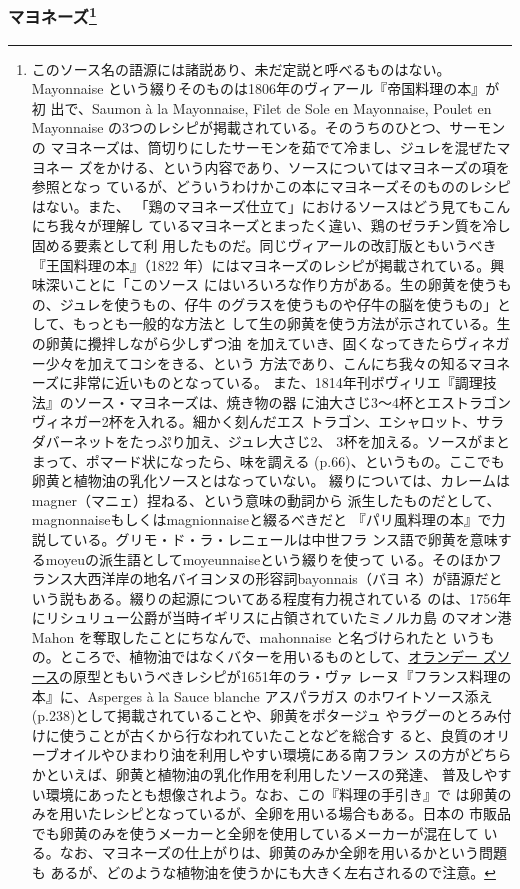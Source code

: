 \begin{recette}
{\subsubsection[マヨネーズ]{\texorpdfstring{マヨネーズ\footnote{このソース名の語源には諸説あり、未だ定説と呼べるものはない。
  Mayonnaise という綴りそのものは1806年のヴィアール『帝国料理の本』が初
  出で、Saumon à la Mayonnaise, Filet de Sole en Mayonnaise, Poulet en
  Mayonnaise の3つのレシピが掲載されている。そのうちのひとつ、サーモンの
  マヨネーズは、筒切りにしたサーモンを茹でて冷まし、ジュレを混ぜたマヨネー
  ズをかける、という内容であり、ソースについてはマヨネーズの項を参照となっ
  ているが、どういうわけかこの本にマヨネーズそのもののレシピはない。また、
  「鶏のマヨネーズ仕立て」におけるソースはどう見てもこんにち我々が理解し
  ているマヨネーズとまったく違い、鶏のゼラチン質を冷し固める要素として利
  用したものだ。同じヴィアールの改訂版ともいうべき『王国料理の本』（1822
  年）にはマヨネーズのレシピが掲載されている。興味深いことに「このソース
  にはいろいろな作り方がある。生の卵黄を使うもの、ジュレを使うもの、仔牛
  のグラスを使うものや仔牛の脳を使うもの」として、もっとも一般的な方法と
  して生の卵黄を使う方法が示されている。生の卵黄に攪拌しながら少しずつ油
  を加えていき、固くなってきたらヴィネガー少々を加えてコシをきる、という
  方法であり、こんにち我々の知るマヨネーズに非常に近いものとなっている。
  また、1814年刊ボヴィリエ『調理技法』のソース・マヨネーズは、焼き物の器
  に油大さじ3〜4杯とエストラゴンヴィネガー2杯を入れる。細かく刻んだエス
  トラゴン、エシャロット、サラダバーネットをたっぷり加え、ジュレ大さじ2、
  3杯を加える。ソースがまとまって、ポマード状になったら、味を調える
  (p.66)、というもの。ここでも卵黄と植物油の乳化ソースとはなっていない。
  綴りについては、カレームはmagner（マニェ）捏ねる、という意味の動詞から
  派生したものだとして、magnonnaiseもしくはmagnionnaiseと綴るべきだと
  『パリ風料理の本』で力説している。グリモ・ド・ラ・レニェールは中世フラ
  ンス語で卵黄を意味するmoyeuの派生語としてmoyeunnaiseという綴りを使って
  いる。そのほかフランス大西洋岸の地名バイヨンヌの形容詞bayonnais（バヨ
  ネ）が語源だという説もある。綴りの起源についてある程度有力視されている
  のは、1756年にリシュリュー公爵が当時イギリスに占領されていたミノルカ島
  のマオン港 Mahon を奪取したことにちなんで、mahonnaise と名づけられたと
  いうもの。ところで、植物油ではなくバターを用いるものとして、\protect\hyperlink{sauce-hollandaise}{オランデー
  ズソース}の原型ともいうべきレシピが1651年のラ・ヴァ
  レーヌ『フランス料理の本』に、Asperges à la Sauce blanche アスパラガス
  のホワイトソース添え(p.238)として掲載されていることや、卵黄をポタージュ
  やラグーのとろみ付けに使うことが古くから行なわれていたことなどを総合す
  ると、良質のオリーブオイルやひまわり油を利用しやすい環境にある南フラン
  スの方がどちらかといえば、卵黄と植物油の乳化作用を利用したソースの発達、
  普及しやすい環境にあったとも想像されよう。なお、この『料理の手引き』で
  は卵黄のみを用いたレシピとなっているが、全卵を用いる場合もある。日本の
  市販品でも卵黄のみを使うメーカーと全卵を使用しているメーカーが混在して
  いる。なお、マヨネーズの仕上がりは、卵黄のみか全卵を用いるかという問題も
  あるが、どのような植物油を使うかにも大きく左右されるので注意。}}{マヨネーズ}}\label{mayonnaise}}


\end{recette}

